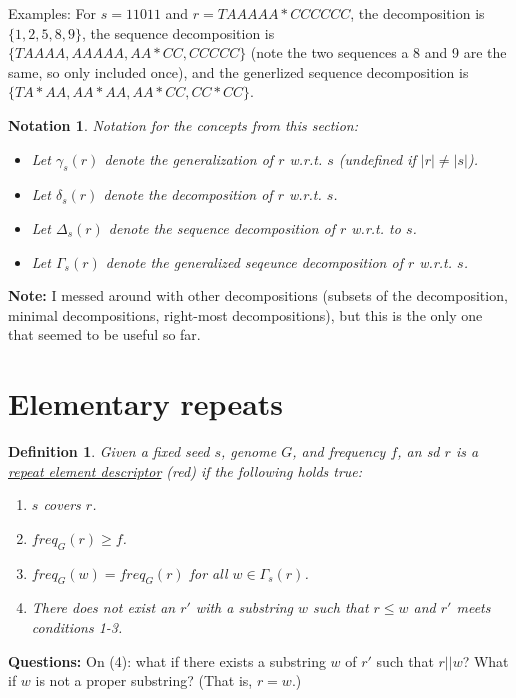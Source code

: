 \documentclass{article}
\newtheorem{notation}{Notation}
\newtheorem{definition}{Definition}
\begin{document}
Examples: For $s=11011$ and $r = TAAAAA*CCCCCC$, the decomposition is
$\{1,2,5,8,9\}$, the sequence decomposition is $\{TAAAA, AAAAA, AA*CC,
CCCCC\}$ (note the two sequences a 8 and 9 are the same, so only
included once), and the generlized sequence decomposition is $\{TA*AA,
AA*AA, AA*CC, CC*CC\}$. 
    
\begin{notation}
Notation for the concepts from this section:
  \begin{itemize}
  \item Let $\gamma_s(r)$ denote the generalization of $r$ w.r.t. $s$
  (undefined if $|r| \neq |s|$).
  \item Let $\delta_s(r)$ denote the decomposition of $r$ w.r.t. $s$.
  \item Let $\Delta_s(r)$ denote the sequence decomposition of $r$ w.r.t. to
  $s$.
  \item Let $\Gamma_s(r)$ denote the generalized seqeunce decomposition of
  $r$ w.r.t. $s$.
  \end{itemize}
\end{notation}

{\bf Note:} I messed around with other decompositions (subsets of the
decomposition, minimal decompositions, right-most decompositions), but
this is the only one that seemed to be useful so far.

\section{Elementary repeats}

\begin{definition}
  \label{ERdef}
  Given a fixed seed $s$, genome $G$, and frequency $f$, an sd $r$ is
  a \underline{repeat element descriptor} (red) if the following
  holds true:
  \begin{enumerate}
  \item $s$ covers $r$.
  \item $freq_G(r) \geq f$.
  \item $freq_G(w) = freq_G(r)$ for all $w \in \Gamma_s(r)$.
  \item There does not exist an $r'$ with a substring $w$ such that
    $r \leq w$ and $r'$ meets conditions 1-3.
  \end{enumerate}
\end{definition}
{\bf Questions:} On (4): what if there exists a substring $w$ of $r'$
such that $r || w$?  What if $w$ is not a proper substring?  (That is,
$r = w$.)
\end{document}
